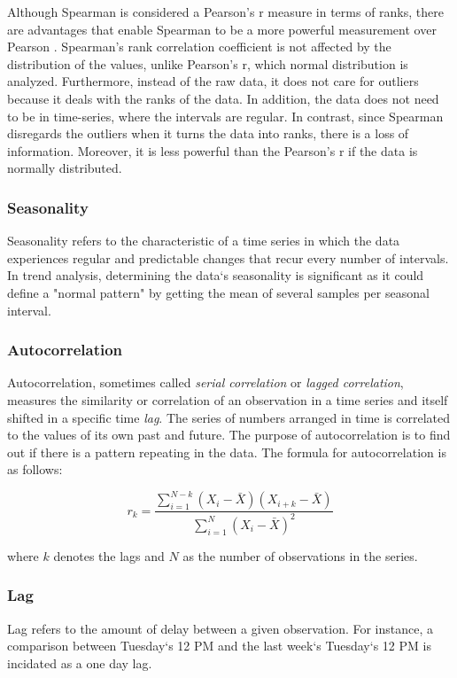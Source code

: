 Although Spearman is considered a Pearson’s r measure in terms of ranks, there are advantages that enable Spearman to be a more powerful measurement over Pearson . Spearman’s rank correlation coefficient is not affected by the distribution of the values, unlike Pearson’s r, which normal distribution is analyzed. Furthermore, instead of the raw data, it does not care for outliers because it deals with the ranks of the data. In addition, the data does not need to be in time-series, where the intervals are regular. In contrast, since Spearman disregards the outliers when it turns the data into ranks, there is a loss of information. Moreover, it is less powerful than the Pearson’s r if the data is normally distributed.


\subsubsection{Seasonality}
Seasonality refers to the characteristic of a time series in which the data experiences regular and predictable changes that recur every number of intervals. In trend analysis, determining the data`s seasonality is significant as it could define a "normal pattern" by getting the mean of several samples per seasonal interval.


\subsubsection{Autocorrelation}
Autocorrelation, sometimes called \textit{serial correlation} or \textit{lagged correlation}, measures the similarity or correlation of an observation in a time series and itself shifted in a specific time \textit{lag}. The series of numbers arranged in time is correlated to the values of its own past and future. The purpose of autocorrelation is to find out if there is a pattern repeating in the data. The formula for autocorrelation is as follows: 

\begin{equation}
r_{k} = \frac{\sum_{i=1}^{N-k}(X_{i} - \bar{X})(X_{i+k} - \bar{X})} {\sum_{i=1}^{N}(X_{i} - \bar{X})^{2} }
\end{equation}

\noindent where $k$ denotes the lags and $N$ as the number of observations in the series.


\subsubsection{Lag}
Lag refers to the amount of delay between a given observation. For instance, a comparison between Tuesday`s 12 PM and the last week`s Tuesday`s 12 PM is incidated as a one day lag.


